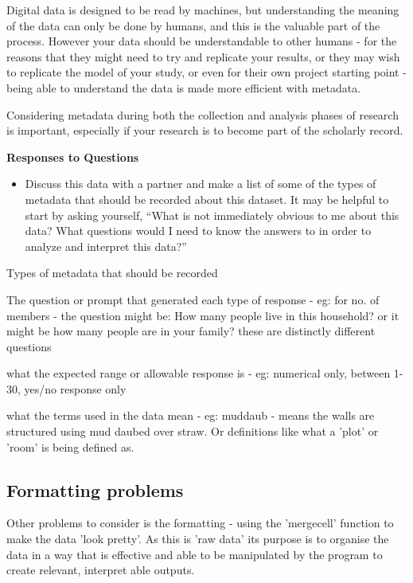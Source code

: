 \documentclass{article}
\begin{document}
Digital data is designed to be read by machines, but understanding the meaning of the data can only be done by humans, and this is the valuable part of the process. However your data should be understandable to other humans - for the reasons that they might need to try and replicate your results, or they may wish to replicate the model of your study, or even for their own project starting point - being able to understand the data is made more efficient with metadata. 

Considering metadata during both the collection and analysis phases of research is important, especially if your research is to become part of the scholarly record. 

\textbf{Responses to Questions}
\begin{itemize}
    \item Discuss this data with a partner and make a list of some of the types of metadata that should be recorded about this dataset. It may be helpful to start by asking yourself, “What is not immediately obvious to me about this data? What questions would I need to know the answers to in order to analyze and interpret this data?”
\end{itemize}

Types of metadata that should be recorded
\begin{itemise}
    \item The question or prompt that generated each type of response - eg: for no. of members - the question might be: How many people live in this household? or it might be how many people are in your family? these are distinctly different questions
    \item what the expected range or allowable response is - eg: numerical only, between 1-30, yes/no response only
    \item what the terms used in the data mean - eg: muddaub - means the walls are structured using mud daubed over straw. Or definitions like what a 'plot' or 'room' is being defined as. 
\end{itemise}

\subsection{Formatting problems}

Other problems to consider is the formatting - using the 'mergecell' function to make the data 'look pretty'.
As this is 'raw data' its purpose is to organise the data in a way that is effective and able to be manipulated by the program to create relevant, interpret able outputs. 
\end{document}
